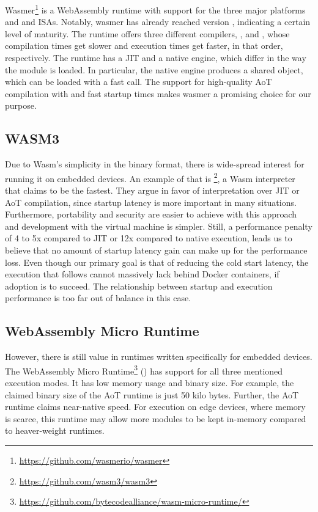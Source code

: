 Wasmer\footnote{\url{https://github.com/wasmerio/wasmer}} is a WebAssembly runtime with support for the three major platforms and  and  ISAs. Notably, wasmer has already reached version , indicating a certain level of maturity. The runtime offers three different compilers, ,  and , whose compilation times get slower and execution times get faster, in that order, respectively. The runtime has a JIT and a native engine, which differ in the way the module is loaded. In particular, the native engine produces a shared object, which can be loaded with a fast  call. The support for high-quality AoT compilation with  and fast startup times makes wasmer a promising choice for our purpose.

\subsection{WASM3}

Due to Wasm's simplicity in the binary format, there is wide-spread interest for running it on embedded devices. An example of that is \footnote{\url{https://github.com/wasm3/wasm3}}, a Wasm interpreter that claims to be the fastest. They argue in favor of interpretation over JIT or AoT compilation, since startup latency is more important in many situations. Furthermore, portability and security are easier to achieve with this approach and development with the virtual machine is simpler. Still, a performance penalty of 4 to 5x compared to JIT or 12x compared to native execution, leads us to believe that no amount of startup latency gain can make up for the performance loss. Even though our primary goal is that of reducing the cold start latency, the execution that follows cannot massively lack behind Docker containers, if adoption is to succeed. The relationship between startup and execution performance is too far out of balance in this case.

\subsection{WebAssembly Micro Runtime}

However, there is still value in runtimes written specifically for embedded devices. The WebAssembly Micro Runtime\footnote{\url{https://github.com/bytecodealliance/wasm-micro-runtime/}} () has support for all three mentioned execution modes. It has low memory usage and binary size. For example, the claimed binary size of the AoT runtime is just 50 kilo bytes. Further, the AoT runtime claims near-native speed. For execution on edge devices, where memory is scarce, this runtime may allow more modules to be kept in-memory compared to heaver-weight runtimes.

